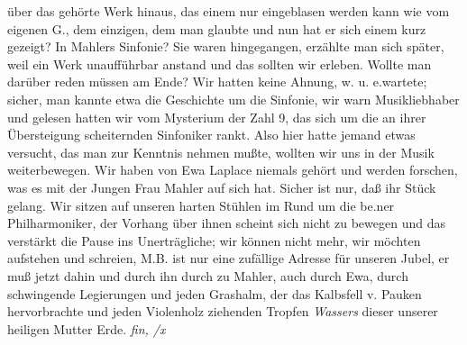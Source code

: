 \documentclass[
]{article}
\begin{document}
über das gehörte Werk hinaus, das einem nur eingeblasen werden kann wie
vom eigenen G., dem einzigen, dem man glaubte und nun hat er sich einem
kurz gezeigt? In Mahlers Sinfonie? Sie waren hingegangen, erzählte man
sich später, weil ein Werk unaufführbar anstand und das sollten wir
erleben. Wollte man darüber reden müssen am Ende? Wir hatten keine
Ahnung, w. u. e.wartete; sicher, man kannte etwa die Geschichte um die
Sinfonie, wir warn Musikliebhaber und gelesen hatten wir vom Mysterium
der Zahl 9, das sich um die an ihrer Übersteigung scheiternden
Sinfoniker rankt. Also hier hatte jemand etwas versucht, das man zur
Kenntnis nehmen mußte, wollten wir uns in der Musik weiterbewegen. Wir
haben von Ewa Laplace niemals gehört und werden forschen, was es mit der
Jungen Frau Mahler auf sich hat. Sicher ist nur, daß ihr Stück gelang.
Wir sitzen auf unseren harten Stühlen im Rund um die be.ner
Philharmoniker, der Vorhang über ihnen scheint sich nicht zu bewegen und
das verstärkt die Pause ins Unerträgliche; wir können nicht mehr, wir
möchten aufstehen und schreien, M.B. ist nur eine zufällige Adresse für
unseren Jubel, er muß jetzt dahin und durch ihn durch zu Mahler, auch
durch Ewa, durch schwingende Legierungen und jeden Grashalm, der das
Kalbsfell v. Pauken hervorbrachte und jeden Violenholz ziehenden Tropfen
\emph{Wassers} dieser unserer heiligen Mutter Erde. \emph{fin, /x}
\end{document}
